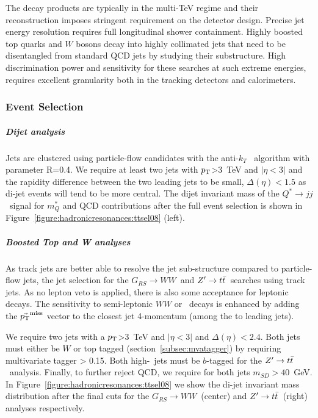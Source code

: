 \documentclass{cernrep}
\newcommand*{\zptt}{\ensuremath{Z^{\prime} \rightarrow \ttbar}}
\newcommand*{\qjj}{\ensuremath{Q^{*} \rightarrow jj}}
\newcommand*{\rsg}{\ensuremath{G_{RS} \rightarrow WW}}
\newcommand*{\metvec}{\vec{\pt}^{\textrm{miss}}}
\begin{document}
The decay products are typically in the multi-TeV regime and their reconstruction imposes stringent requirement on the detector design. Precise jet energy resolution requires full longitudinal shower containment. Highly boosted top quarks and $W$ bosons decay into highly collimated jets that need to  be disentangled from standard QCD jets by studying their substructure. High discrimination power and sensitivity for these searches at such extreme energies, requires excellent granularity both in the tracking detectors and calorimeters.

\subsubsection{Event Selection}

\subparagraph{Dijet analysis}

Jets are clustered using particle-flow candidates with the anti-$k_T$~\cite{Cacciari:2008gp} algorithm with parameter R=0.4. We require at least two jets with $p_{\text{T}}$>3~TeV and $|\eta<3|$ and the rapidity difference between the two leading jets to be small, $\Delta(\eta)<1.5$ as di-jet events will tend to be more central. The dijet invariant mass of the \qjj\ signal for $m_Q^{*}$ and QCD contributions after the full event selection is shown in Figure~\ref{figure:hadronicresonances:ttsel08} (left).

\subparagraph{Boosted Top and W analyses}

As track jets are better able to resolve the jet sub-structure compared to particle-flow jets, the jet selection for the \rsg\ and \zptt\ searches using track jets. As no lepton veto is applied, there is also some acceptance for leptonic decays. The sensitivity to semi-leptonic $WW$ or \ttbar\ decays is enhanced by adding the $\metvec$ vector to the closest jet 4-momentum (among the to leading jets).

We require two jets with a $p_{\text{T}}$>3~TeV and $|\eta<3|$ and $\Delta(\eta)<2.4$. Both jets must either be $W$ or top tagged (section~\ref{subsec:mvatagger}) by requiring multivariate tagger > 0.15. Both high-\pt\ jets must be $b$-tagged for the \zptt\ analysis. Finally, to further reject QCD, we require for both jets $m_{SD}>40$~GeV. In Figure~\ref{figure:hadronicresonances:ttsel08} we show the di-jet invariant mass distribution after the final cuts for the \rsg\ (center) and \zptt\ (right) analyses respectively.
\end{document}
